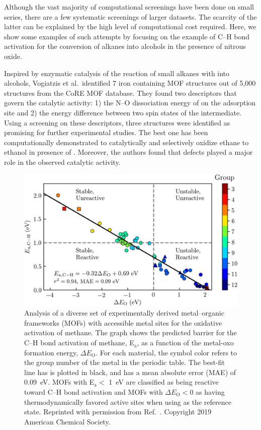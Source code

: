 \documentclass[main.tex]{subfiles}
\begin{document}
Although the vast majority of computational screenings have been done on small series, there are a few systematic screenings of larger datasets. The scarcity of the latter can be explained by the high level of computational cost required. Here, we show some examples of such attempts by focusing on the example of C--H bond activation for the conversion of alkanes into alcohols in the presence of nitrous oxide.

Inspired by enzymatic catalysis of the reaction of small alkanes with  into alcohols, Vogiatzis et al.\ identified 7 iron containing MOF structures out of 5,000 structures from the CoRE MOF database.\cite{Vogiatzis_2016} They found two descriptors that govern the catalytic activity: 1) the N--O dissociation energy of  on the adsorption site and 2) the energy difference between two spin states of the intermediate.
Using a screening on these descriptors, three structures were identified as promising for further experimental studies. The best one has been computationally demonstrated to catalytically and selectively oxidize ethane to ethanol in presence of . Moreover, the authors found that defects played a major role in the observed catalytic activity.

\begin{figure}[ht]
\centering
  \includegraphics[width=0.8\linewidth]{figures/1-screening/Rosen_2019.jpeg}
  \caption{Analysis of a diverse set of experimentally derived metal--organic frameworks (MOFs) with accessible metal sites for the oxidative activation of methane. The graph shows the predicted barrier for the C--H bond activation of methane, E$_\text{a}$, as a function of the metal-oxo formation energy, $\Delta E_\text{O}$. For each material, the symbol color refers to the group number of the metal in the periodic table. The best-fit line has is plotted in black, and has a mean absolute error (MAE) of \SI{0.09}{\eV}. MOFs with E$_\text{a}<$ \SI{1}{\eV} are classified as being reactive toward C--H bond activation and MOFs with $\Delta E_\text{O}<0$ as having thermodynamically favored active sites when using  as the reference state. Reprinted with permission from Ref.~. Copyright 2019 American Chemical Society.}
  \label{fgr:Rosen_2019}
\end{figure}
\end{document}
